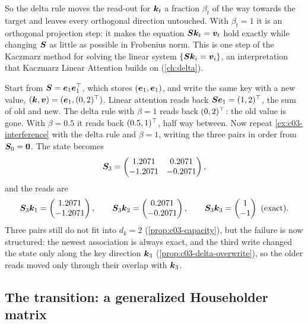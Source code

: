 So the delta rule moves the read-out for $\bm{k}_t$ a fraction $\beta_t$ of the way towards the
target and leaves every orthogonal direction untouched. With $\beta_t=1$ it is an orthogonal
projection step: it makes the equation $\bm{S}\bm{k}_t=\bm{v}_t$ hold exactly while changing $\bm{S}$ as
little as possible in Frobenius norm. This is one step of the Kaczmarz method for solving the
linear system $\{\bm{S}\bm{k}_i=\bm{v}_i\}$, an interpretation that Kaczmarz Linear Attention
\citep{zou2026kaczmarz} builds on (\cref{ch:delta}).

\begin{example}\label{ex:c03-delta}
Start from $\bm{S}=\bm{e}_1\bm{e}_1^{\top}$, which stores $(\bm{e}_1,\bm{e}_1)$, and write the same key with a new
value, $(\bm{k},\bm{v})=(\bm{e}_1,(0,2)^{\top})$. Linear attention reads back $\bm{S}\bm{e}_1=(1,2)^{\top}$, the sum of
old and new. The delta rule with $\beta=1$ reads back $(0,2)^{\top}$: the old value is gone. With
$\beta=0.5$ it reads back $(0.5,1)^{\top}$, half way between.
Now repeat \cref{ex:c03-interference} with the delta rule and $\beta=1$, writing the three pairs
in order from $\bm{S}_0=\bm 0$. The state becomes
\[
  \bm{S}_3=\begin{pmatrix}1.2071 & 0.2071\\ -1.2071 & -0.2071\end{pmatrix},
\]
and the reads are
\[
  \bm{S}_3\bm{k}_1=\begin{pmatrix}1.2071\\-1.2071\end{pmatrix},\qquad
  \bm{S}_3\bm{k}_2=\begin{pmatrix}0.2071\\-0.2071\end{pmatrix},\qquad
  \bm{S}_3\bm{k}_3=\begin{pmatrix}1\\-1\end{pmatrix}\ (\text{exact}).
\]
Three pairs still do not fit into $d_k=2$
(\cref{prop:c03-capacity}), but the failure is now structured: the newest association is
always exact, and the third write changed the state only along the key direction $\bm{k}_3$
(\cref{prop:c03-delta-overwrite}), so the older reads moved only through their overlap with
$\bm{k}_3$.
\end{example}

\subsection{The transition: a generalized Householder matrix}\label{sec:c03-householder}

